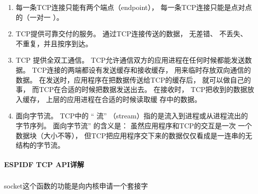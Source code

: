 \documentclass[a4paper,12pt,english]{sphinxmanual}
\begin{document}
{{\begin{enumerate}
\item {} 
\sphinxAtStartPar
每一条TCP连接只能有两个端点（endpoint）， 每一条TCP连接只能是点对点的（一对一 ）。

\item {} 
\sphinxAtStartPar
TCP提供可靠交付的服务。 通过TCP连接传送的数据， 无差错、 不丢失、 不重复，并且按序到达。

\item {} 
\sphinxAtStartPar
TCP 提供全双工通信。 TCP允许通信双方的应用进程在任何时候都能发送数据。 TCP连接的两端都设有发送缓存和接收缓存， 用来临时存放双向通信的数据。 在发送时，应用程序在把数据传送给TCP的缓存后， 就可以做自己的事， 而TCP在合适的时候把数据发送出去。 在接收时， TCP把收到的数据放入缓存， 上层的应用进程在合适的时候读取缓 存中的数据。

\item {} 
\sphinxAtStartPar
面向字节流。 TCP中的 “ 流” （stream）指的是流入到进程或从进程流出的字节序列。 面向字节流” 的含义是： 虽然应用程序和TCP的交互是一次 一个数据块（大小不等）， 但TCP把应用程序交下来的数据仅仅看成是一连串的无结构的字节流。

\end{enumerate}


\paragraph{ESP\sphinxhyphen{}IDF TCP API详解}
\label{\detokenize{exp-esp32/socket/tcp:esp-idf-tcp-api}}

\subparagraph{}
\label{\detokenize{exp-esp32/socket/tcp:socket}}
\sphinxAtStartPar
socket这个函数的功能是向内核申请一个套接字

\begin{sphinxVerbatim}[commandchars=\\\{\}]




\end{sphinxVerbatim}}}
\end{document}
